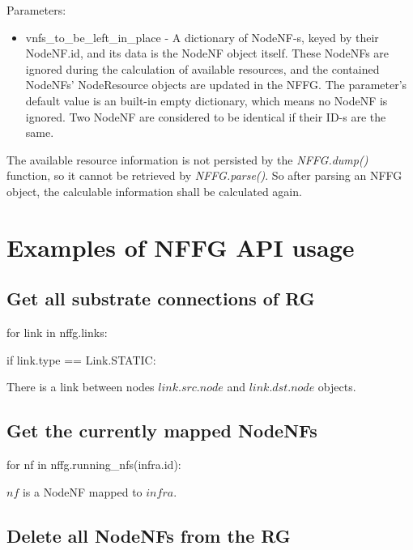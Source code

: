 \documentclass[a4paper,10pt]{scrartcl}
\begin{document}
Parameters:
\begin{itemize}
\item vnfs\_to\_be\_left\_in\_place - A dictionary of NodeNF-s, keyed by their NodeNF.id, and its data 
is the NodeNF object itself. These NodeNFs are ignored during the calculation of available resources, 
and the contained NodeNFs' NodeResource objects are updated in the NFFG. 
The parameter's default value is an built-in empty dictionary, which means no NodeNF is ignored.
Two NodeNF are considered to be identical if their ID-s are the same.
\end{itemize}

The available resource information is not persisted by the \emph{NFFG.dump()} function, 
so it cannot be retrieved by \emph{NFFG.parse()}. So after parsing an NFFG object, the calculable 
information shall be calculated again.


\section{Examples of NFFG API usage}


\subsection*{Get all substrate connections of RG}

for link in nffg.links: 

if link.type == Link.STATIC:

There is a link between nodes $link.src.node$ and $link.dst.node$ objects.

\subsection*{Get the currently mapped NodeNFs}

for nf in nffg.running\_nfs(infra.id):

$nf$ is a NodeNF mapped to $infra$.

\subsection*{Delete all NodeNFs from the RG}
\end{document}
